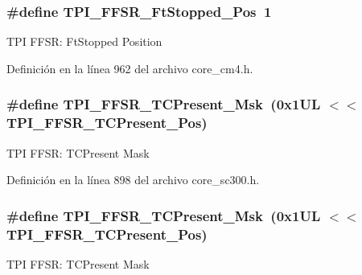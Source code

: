 \subsubsection[{\texorpdfstring{T\+P\+I\+\_\+\+F\+F\+S\+R\+\_\+\+Ft\+Stopped\+\_\+\+Pos}{TPI_FFSR_FtStopped_Pos}}]{\setlength{\rightskip}{0pt plus 5cm}\#define T\+P\+I\+\_\+\+F\+F\+S\+R\+\_\+\+Ft\+Stopped\+\_\+\+Pos~1}\hypertarget{group___c_m_s_i_s___t_p_i_gaedf31fd453a878021b542b644e2869d2}{}\label{group___c_m_s_i_s___t_p_i_gaedf31fd453a878021b542b644e2869d2}
T\+PI F\+F\+SR\+: Ft\+Stopped Position 

Definición en la línea 962 del archivo core\+\_\+cm4.\+h.

\subsubsection[{\texorpdfstring{T\+P\+I\+\_\+\+F\+F\+S\+R\+\_\+\+T\+C\+Present\+\_\+\+Msk}{TPI_FFSR_TCPresent_Msk}}]{\setlength{\rightskip}{0pt plus 5cm}\#define T\+P\+I\+\_\+\+F\+F\+S\+R\+\_\+\+T\+C\+Present\+\_\+\+Msk~(0x1\+U\+L $<$$<$ T\+P\+I\+\_\+\+F\+F\+S\+R\+\_\+\+T\+C\+Present\+\_\+\+Pos)}\hypertarget{group___c_m_s_i_s___t_p_i_ga0d6bfd263ff2fdec72d6ec9415fb1135}{}\label{group___c_m_s_i_s___t_p_i_ga0d6bfd263ff2fdec72d6ec9415fb1135}
T\+PI F\+F\+SR\+: T\+C\+Present Mask 

Definición en la línea 898 del archivo core\+\_\+sc300.\+h.

\subsubsection[{\texorpdfstring{T\+P\+I\+\_\+\+F\+F\+S\+R\+\_\+\+T\+C\+Present\+\_\+\+Msk}{TPI_FFSR_TCPresent_Msk}}]{\setlength{\rightskip}{0pt plus 5cm}\#define T\+P\+I\+\_\+\+F\+F\+S\+R\+\_\+\+T\+C\+Present\+\_\+\+Msk~(0x1\+U\+L $<$$<$ T\+P\+I\+\_\+\+F\+F\+S\+R\+\_\+\+T\+C\+Present\+\_\+\+Pos)}\hypertarget{group___c_m_s_i_s___t_p_i_ga0d6bfd263ff2fdec72d6ec9415fb1135}{}\label{group___c_m_s_i_s___t_p_i_ga0d6bfd263ff2fdec72d6ec9415fb1135}
T\+PI F\+F\+SR\+: T\+C\+Present Mask 

